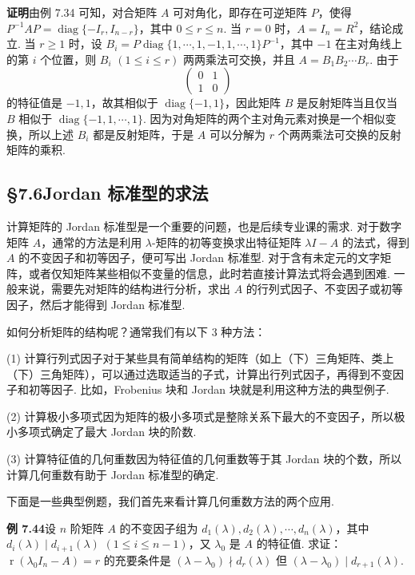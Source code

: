 \documentclass[UTF8,12pt,a4paper,fontset=fandol]{ctexart}
\begin{document}
\noindent\textbf{证明}\quad 由例 7.34 可知，对合矩阵 $A$ 可对角化，即存在可逆矩阵 $P$，使得 $P^{-1}AP=\operatorname{diag}\{-I_r,I_{n-r}\}$，其中 $0\le r\le n$. 当 $r=0$ 时，$A=I_n=R^2$，结论成立. 当 $r\ge 1$ 时，设 $B_i=P\operatorname{diag}\{1,\cdots,1,-1,1,\cdots,1\}P^{-1}$，其中 $-1$ 在主对角线上的第 $i$ 个位置，则 $B_i$ $(1\le i\le r)$ 两两乘法可交换，并且 $A=B_1B_2\cdots B_r$. 由于
\[
\left(\begin{array}{cc}
0 & 1\\
1 & 0
\end{array}\right)
\]
的特征值是 $-1,1$，故其相似于 $\operatorname{diag}\{-1,1\}$，因此矩阵 $B$ 是反射矩阵当且仅当 $B$ 相似于 $\operatorname{diag}\{-1,1,\cdots,1\}$. 因为对角矩阵的两个主对角元素对换是一个相似变换，所以上述 $B_i$ 都是反射矩阵，于是 $A$ 可以分解为 $r$ 个两两乘法可交换的反射矩阵的乘积.

\subsection*{§7.6\quad Jordan 标准型的求法}

计算矩阵的 Jordan 标准型是一个重要的问题，也是后续专业课的需求. 对于数字矩阵 $A$，通常的方法是利用 $\lambda$-矩阵的初等变换求出特征矩阵 $\lambda I-A$ 的法式，得到 $A$ 的不变因子和初等因子，便可写出 Jordan 标准型. 对于含有未定元的文字矩阵，或者仅知矩阵某些相似不变量的信息，此时若直接计算法式将会遇到困难. 一般来说，需要先对矩阵的结构进行分析，求出 $A$ 的行列式因子、不变因子或初等因子，然后才能得到 Jordan 标准型.

如何分析矩阵的结构呢？通常我们有以下 3 种方法：

(1) 计算行列式因子\quad 对于某些具有简单结构的矩阵（如上（下）三角矩阵、类上（下）三角矩阵），可以通过选取适当的子式，计算出行列式因子，再得到不变因子和初等因子. 比如，Frobenius 块和 Jordan 块就是利用这种方法的典型例子.

(2) 计算极小多项式\quad 因为矩阵的极小多项式是整除关系下最大的不变因子，所以极小多项式确定了最大 Jordan 块的阶数.

(3) 计算特征值的几何重数\quad 因为特征值的几何重数等于其 Jordan 块的个数，所以计算几何重数有助于 Jordan 标准型的确定.

下面是一些典型例题，我们首先来看计算几何重数方法的两个应用.

\noindent\textbf{例 7.44}\quad 设 $n$ 阶矩阵 $A$ 的不变因子组为 $d_1(\lambda),d_2(\lambda),\cdots,d_n(\lambda)$，其中 $d_i(\lambda)\mid d_{i+1}(\lambda)$ $(1\le i\le n-1)$，又 $\lambda_0$ 是 $A$ 的特征值. 求证：$\operatorname{r}(\lambda_0I_n-A)=r$ 的充要条件是 $(\lambda-\lambda_0)\nmid d_r(\lambda)$ 但 $(\lambda-\lambda_0)\mid d_{r+1}(\lambda)$.
\end{document}
